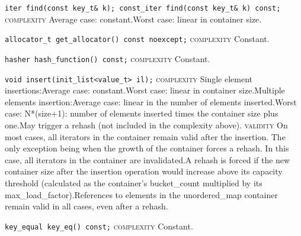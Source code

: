\noindent{}\hspace*{0.25em}\lstinline[basicstyle=\ttfamily\color{corange}]{iter find(const key_t& k); const_iter find(const key_t& k) const;} \textsc{complexity} Average case: constant.Worst case: linear in container size.\\\vspace{-0.6em}

\noindent{}\hspace*{0.25em}\lstinline[basicstyle=\ttfamily\color{cgreen}]{allocator_t get_allocator() const noexcept;} \textsc{complexity} Constant.\\\vspace{-0.6em}

\noindent{}\hspace*{0.25em}\lstinline[basicstyle=\ttfamily\color{cgreen}]{hasher hash_function() const;} \textsc{complexity} Constant.\\\vspace{-0.6em}

\noindent{}\hspace*{0.25em}\lstinline[basicstyle=\ttfamily\color{corange}]{void insert(init_list<value_t> il);} \textsc{complexity} Single element insertions:Average case: constant.Worst case: linear in container size.Multiple elements insertion:Average case: linear in the number of elements inserted.Worst case: N*(size+1): number of elements inserted times the container size plus one.May trigger a rehash (not included in the complexity above). \textsc{validity} On most cases, all iterators in the container remain valid after the insertion. The only exception being when the growth of the container forces a rehash. In this case, all iterators in the container are invalidated.A rehash is forced if the new container size after the insertion operation would increase above its capacity threshold (calculated as the container's bucket\_count multiplied by its max\_load\_factor).References to elements in the unordered\_map container remain valid in all cases, even after a rehash.\\\vspace{-0.6em}

\noindent{}\hspace*{0.25em}\lstinline[basicstyle=\ttfamily\color{cgreen}]{key_equal key_eq() const;} \textsc{complexity} Constant.\\\vspace{-0.6em}

